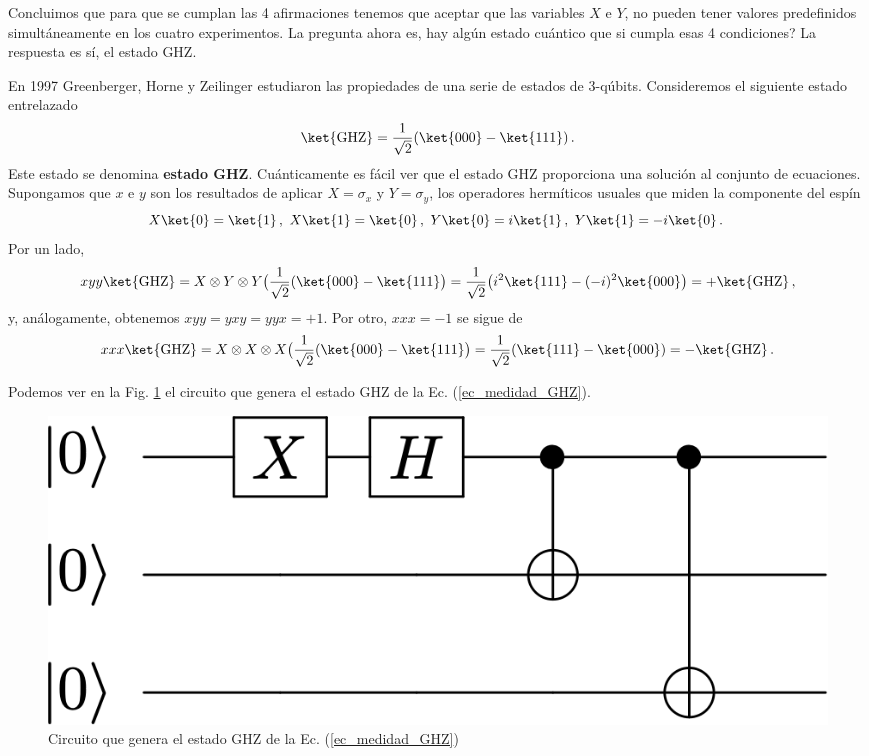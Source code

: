 \documentclass[a4paper,11pt]{book} %
\numberwithin{equation}{chapter}
\begin{document}
Concluimos que para que se cumplan las 4 afirmaciones tenemos que aceptar que las variables $X$ e $Y$, no pueden tener valores predefinidos simultáneamente  en los cuatro experimentos. La pregunta ahora es, hay algún estado cuántico que si cumpla esas 4 condiciones? La respuesta es sí, el estado GHZ.

En 1997 Greenberger, Horne y Zeilinger estudiaron las propiedades de una serie de estados de 3-qúbits.   Consideremos el siguiente estado entrelazado
	\begin{equation} \label{ec_medidad_GHZ}
	\ket{\rm GHZ} = \frac{1}{\sqrt{2}}( \ket{000} - \ket{111} )\, . 
	\end{equation}
Este estado se denomina \textbf{estado GHZ}. Cuánticamente es fácil ver que el estado GHZ proporciona una solución al conjunto de ecuaciones. Supongamos que  $x$ e $y$ son los resultados de aplicar $X = \sigma_x$ y $Y = \sigma_y$, los operadores hermíticos  usuales que miden la componente del espín
\begin{equation}
X \ket{0} = \ket{1}\, , ~ X \ket{1} = \ket{0}\, , ~ Y \ket{0} = i \ket{1}\, , ~ Y \ket{1} = -i \ket{0}\, . ~ 
\end{equation}
Por un lado, 
\begin{equation}
xyy\ket{{\rm GHZ}}  = X \otimes Y\otimes Y \big(\frac{1}{\sqrt{2}}(\ket{000}-\ket{111}\big) = \frac{1}{\sqrt{2}} \big(i^2 \ket{111}- (-i)^2
\ket{000}\big) = +  \ket{{\rm GHZ}}\, ,
\end{equation}
y, análogamente, obtenemos $xyy=yxy=yyx= +1$. Por otro, $xxx=-1$ se sigue de
\begin{equation}  
xxx  \ket{{\rm GHZ}} =   X \otimes X \otimes X \big(\frac{1}{\sqrt{2}}(\ket{000}-\ket{111}\big) =
\frac{1}{\sqrt{2}}(\ket{111}-\ket{000}) =  - \ket{\rm GHZ}\, .
\end{equation}

Podemos ver en la Fig. \ref{Fig_entrelazamiento_GHZ} el circuito que genera el estado GHZ de la Ec. (\ref{ec_medidad_GHZ}). 

	\begin{figure}[H]
	\centering 
	\includegraphics[width=0.4\linewidth]{Figuras/Fig_entrelazamiento_GHZ.png}
	\caption{Circuito que genera el estado GHZ de la Ec. (\ref{ec_medidad_GHZ})}
	\label{Fig_entrelazamiento_GHZ}
	\end{figure}
\end{document}
